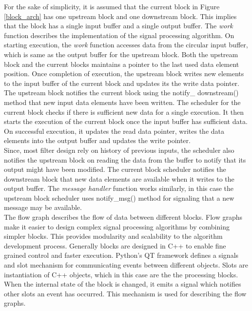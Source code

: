 For the sake of simplicity, it is assumed that the current block in Figure \ref{block_arch} has one upstream block and one downstream block.
This implies that the block has a single input buffer and a single output buffer.
The \textit{work} function describes the implementation of the signal processing algorithm.
On starting execution, the \textit{work} function accesses data from the circular input buffer, which is same as the output buffer for the upstream block.
Both the upstream block and the current blocks maintains a pointer to the last used data element position. 
Once completion of execution, the upstream block writes new elements to the input buffer of the current block and updates its the write data pointer.
The upstream block notifies the current block using the notify\_ downstream() method that new input data elements have been written.
The scheduler for the current block checks if there is sufficient new data for a single execution.
It then starts the execution of the current block once the input buffer has sufficient data.
On successful execution, it updates the read data pointer, writes the data elements into the output buffer and updates the write pointer.\\

Since, most filter design rely on history of previous inputs, the scheduler also notifies the upstream block on reading the data from the buffer to notify that its output might have been modified.
The current block scheduler notifies the downstream block that new data elements are available when it writes to the output buffer.
The \textit{message handler} function works similarly, in this case the upstream block scheduler uses notify\_msg() method for signaling that a new message may be available.\\

The flow graph describes the flow of data between different blocks.
Flow graphs make it easier to design complex signal processing algorithms by combining simpler blocks.
This provides modularity and scalability to the algorithm development process.
Generally blocks are designed in C++ to enable fine grained control and faster execution.
Python's QT framework defines a signals and slot mechanism for communicating events between different objects.
Slots are instantiation of C++ objects, which in this case are the the processing blocks.
When the internal state of the block is changed, it emits a signal which notifies other slots an event has occurred.
This mechanism is used for describing the flow graphs.


